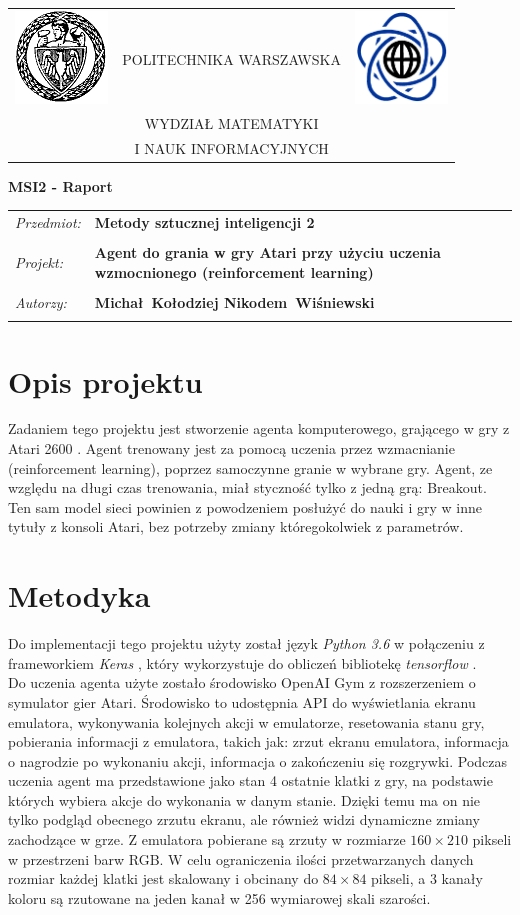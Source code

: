 \documentclass[12pt]{article}
\renewcommand{\maketitle}{
\begin{titlepage}
\begin{table}[t]
\centering
\begin{tabular}[t]{lcr}
 \includegraphics[width=70pt,height=70pt]{PW} & POLITECHNIKA WARSZAWSKA & \includegraphics[width=70pt,height=70pt]{MiNI}\\
& WYDZIAŁ MATEMATYKI & \\
& I NAUK INFORMACYJNYCH &
\end{tabular}
\end{table}
\vspace*{3cm}
  \begin{center}
    \LARGE
    \textbf {MSI2 - Raport}\\
   \vspace*{2 cm}
\begin{table}[!htp]
\begin{tabular}{p{4cm}p{9cm}}
\textit{Przedmiot:} &\textbf {Metody sztucznej inteligencji 2} \\
\\
\textit{Projekt:} &\textbf {Agent do grania w gry Atari przy użyciu uczenia wzmocnionego (reinforcement learning)} \\
\\
\textit{Autorzy:} &\textbf {Michał~Kołodziej \newline Nikodem~Wiśniewski} \\
\\
\end{tabular}
\end{table}

\vspace{5 cm}
  \center{\small Warszawa, dnia \today}
\end{center}
\end{titlepage}
}
\begin{document}
\maketitle

\tableofcontents

\newpage

\section{Opis projektu}
Zadaniem tego projektu jest stworzenie agenta komputerowego, grającego w gry z Atari 2600 \cite{atari}. Agent trenowany jest za pomocą uczenia przez wzmacnianie (reinforcement learning), poprzez samoczynne granie w wybrane gry. Agent, ze względu na długi czas trenowania, miał styczność tylko z jedną grą: Breakout. Ten sam model sieci powinien z powodzeniem posłużyć do nauki i gry w inne tytuły z konsoli Atari, bez potrzeby zmiany któregokolwiek z parametrów.

\section{Metodyka}

Do implementacji tego projektu użyty został język \textit{Python 3.6} w połączeniu z frameworkiem \textit{Keras} \cite{keras}, który wykorzystuje do obliczeń bibliotekę \textit{tensorflow} \cite{tensorflow}. \\
Do uczenia agenta użyte zostało środowisko OpenAI Gym \cite{gym} z rozszerzeniem o symulator gier Atari. Środowisko to udostępnia API do wyświetlania ekranu emulatora, wykonywania kolejnych akcji w emulatorze, resetowania stanu gry, pobierania informacji z emulatora, takich jak: zrzut ekranu emulatora, informacja o nagrodzie po wykonaniu akcji, informacja o zakończeniu się rozgrywki. Podczas uczenia agent ma przedstawione jako stan 4 ostatnie klatki z gry, na podstawie których wybiera akcje do wykonania w danym stanie. Dzięki temu ma on nie tylko podgląd obecnego zrzutu ekranu, ale również widzi dynamiczne zmiany zachodzące w grze. Z emulatora pobierane są zrzuty w rozmiarze $160\times210$ pikseli w przestrzeni barw RGB. W celu ograniczenia ilości przetwarzanych danych rozmiar każdej klatki jest skalowany i obcinany do $84\times84$ pikseli, a 3 kanały koloru są rzutowane na jeden kanał w 256 wymiarowej skali szarości.
\\\
\end{document}
